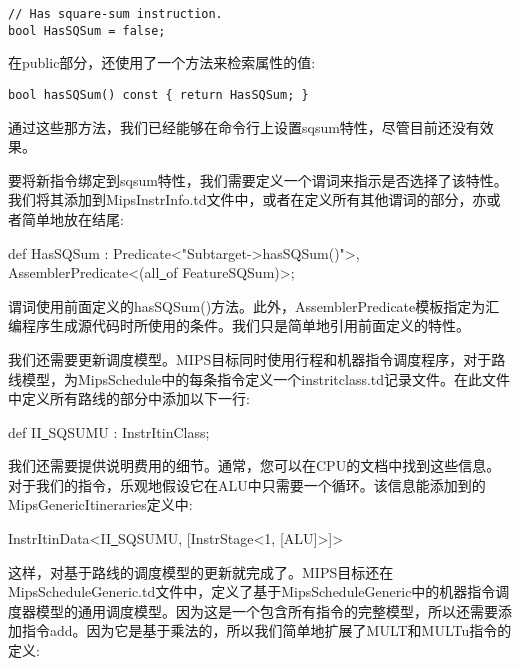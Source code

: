 \begin{lstlisting}[caption={}]
// Has square-sum instruction.
bool HasSQSum = false;
\end{lstlisting}

在public部分，还使用了一个方法来检索属性的值:\par

\begin{lstlisting}[caption={}]
bool hasSQSum() const { return HasSQSum; }
\end{lstlisting}

通过这些那方法，我们已经能够在命令行上设置sqsum特性，尽管目前还没有效果。\par

要将新指令绑定到sqsum特性，我们需要定义一个谓词来指示是否选择了该特性。我们将其添加到MipsInstrInfo.td文件中，或者在定义所有其他谓词的部分，亦或者简单地放在结尾:\par

\begin{tcolorbox}[colback=white,colframe=black]
def HasSQSum : Predicate<"Subtarget->hasSQSum()">, \\
\hspace*{6cm}AssemblerPredicate<(all\underline{~}of FeatureSQSum)>;
\end{tcolorbox}

谓词使用前面定义的hasSQSum()方法。此外，AssemblerPredicate模板指定为汇编程序生成源代码时所使用的条件。我们只是简单地引用前面定义的特性。\par

我们还需要更新调度模型。MIPS目标同时使用行程和机器指令调度程序，对于路线模型，为MipsSchedule中的每条指令定义一个instritclass.td记录文件。在此文件中定义所有路线的部分中添加以下一行:\par

\begin{tcolorbox}[colback=white,colframe=black]
def II\underline{~}SQSUMU : InstrItinClass;
\end{tcolorbox}

我们还需要提供说明费用的细节。通常，您可以在CPU的文档中找到这些信息。对于我们的指令，乐观地假设它在ALU中只需要一个循环。该信息能添加到的MipsGenericItineraries定义中:\par

\begin{tcolorbox}[colback=white,colframe=black]
InstrItinData<II\underline{~}SQSUMU, [InstrStage<1, [ALU]>]>
\end{tcolorbox}

这样，对基于路线的调度模型的更新就完成了。MIPS目标还在MipsScheduleGeneric.td文件中，定义了基于MipsScheduleGeneric中的机器指令调度器模型的通用调度模型。因为这是一个包含所有指令的完整模型，所以还需要添加指令add。因为它是基于乘法的，所以我们简单地扩展了MULT和MULTu指令的定义:\par

